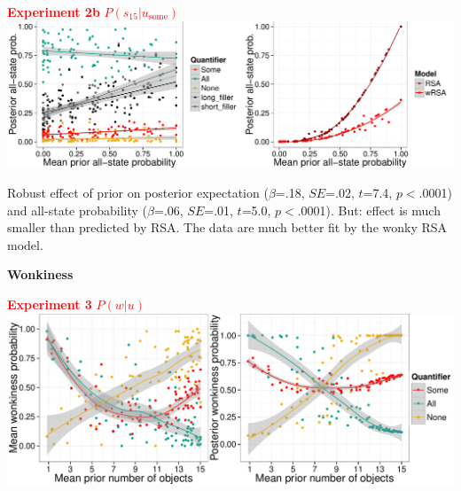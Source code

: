 \documentclass[a0,portrait]{a0poster}
\newcommand{\red}[1]{\textcolor{Red}{#1}}
\begin{document}
\begin{textblock}{7.44}
\begin{textblock}{7.04}
\begin{center}

\hspace{-1em} \textbf{\red{Experiment 2b}} \hspace{9em} \textbf{\red{$P(s_{15}|u_{\textrm{some}})$}}\\
\includegraphics[width=1.01\textwidth]{pics/model-empirical-allprobs}

\end{center}

\large
Robust effect of prior on posterior expectation ($\beta$=.18, $SE$=.02, $t$=7.4, $p$$<$.0001) and all-state probability ($\beta$=.06, $SE$=.01, $t$=5.0, $p$$<$.0001). But: effect is much smaller than predicted by RSA. The data are much better fit by the wonky RSA model.

\vspace{1.5em}

\begin{center}
\large
\textbf{Wonkiness}

\vspace{-0.5em}

\hspace{-1.5em} \textbf{\red{Experiment 3}} \hspace{8.5em} \textbf{\red{$P(w|u)$}}\\
\centering
\includegraphics[width=\textwidth]{pics/model-empirical-wonkiness}
\end{center}

\end{textblock} 

\end{textblock} 
\end{document}

